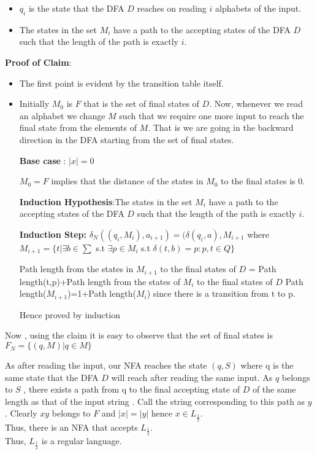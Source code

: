 \documentclass[12pt,a4paper]{article}
\begin{document}
\begin{itemize}
\item $q_i$ is the state that the DFA $D$ reaches on reading $i$ alphabets of the input.
\item The states in the set $M_i$ have a path to the accepting states of the DFA $D$ such that the length of the path is exactly $i$.


\end{itemize}

\textbf{Proof of Claim}:

\begin{itemize}
    \item The first point is evident by the transition table itself.
    \item Initially $M_0$ is $F$ that is the set of final states of $D$. Now, whenever we read an alphabet we change $M$ such that we require one more input to reach the final state from the elements of $M$. That is we are going in the backward direction in the DFA starting from the set of final states.
    
    
    
    
   \textbf{ Base case }: $|x|=0$ 
    
    $M_0=F$ implies that the distance of the states in $M_0$ to the final states is 0.
    
    \textbf{Induction Hypothesis}:The states in the set $M_i$ have a path to the accepting states of the DFA $D$ such that the length of the path is exactly $i$.
    
    \textbf{Induction Step:}
    $\delta_N((q_i,M_i),a_{i+1})=(\delta(q_i,a),M_{i+1}$ where $M_{i+1}=\{t  | \exists b \in \sum $ s.t $\exists p \in M_i $ s.t $\delta(t,b)=p : p,t \in Q\}$
    
    Path length from the states in $M_{i+1}$ to the final states of $D$ = Path length(t,p)+Path length  from the states of $M_i$ to the final states of $D$ 
    Path length($M_{i+1}$)=1+Path length($M_i$) since there is a transition from t to p.
    
    Hence proved by induction
    \end{itemize}

Now , using the claim it is easy to observe that the set of final states is $F_N=\{(q,M)|q\in M\}$

As after reading the input, our NFA reaches the state $(q,S)$ where q is the same state that the DFA $D$ will reach after reading the same input. As $q$ belongs to $S$ , there exists a path from q to the final accepting state of $D$ of the same length as that of the input string . Call the string corresponding to this path as $y$.
Clearly $xy$ belongs to $F$ and $|x|=|y|$  hence $x \in L_\frac{1}{2}$.
\\Thus, there is an NFA that accepts $L_\frac{1}{2}$.
\\Thus, $L_\frac{1}{2}$ is a regular language.
\end{document}
